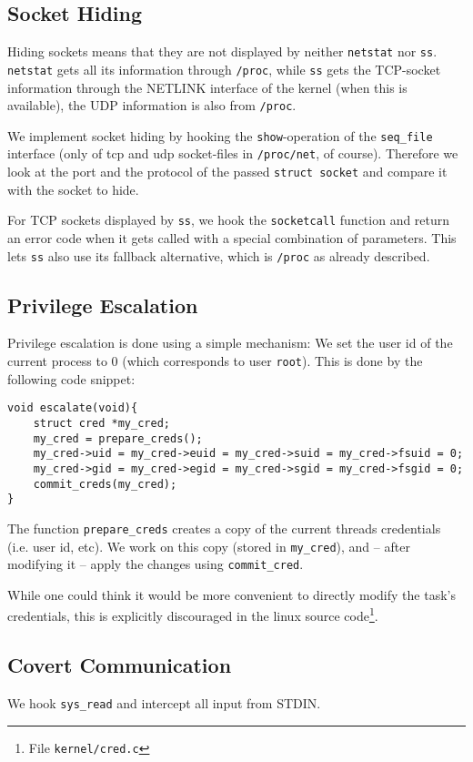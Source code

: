 \documentclass[10pt, letterpaper]{scrartcl}
\begin{document}
\subsection{Socket Hiding}
\label{sec:sockethiding}
Hiding sockets means that they are not displayed by neither \texttt{netstat} nor \texttt{ss}. \texttt{netstat} gets all its information through \texttt{/proc}, while \texttt{ss} gets the TCP-socket information through the NETLINK interface of the kernel (when this is available), the UDP information is also from \texttt{/proc}.

We implement socket hiding by hooking the \texttt{show}-operation of the \texttt{seq\_file} interface (only of tcp and udp socket-files in \texttt{/proc/net}, of course). Therefore we look at the port and the protocol of the passed \texttt{struct socket} and compare it with the socket to hide.

For TCP sockets displayed by \texttt{ss}, we hook the \texttt{socketcall} function and return an error code when it gets called with a special combination of parameters. This lets \texttt{ss} also use its fallback alternative, which is \texttt{/proc} as already described.

\subsection{Privilege Escalation}
\label{sec:privilege_escalation}
Privilege escalation is done using a simple mechanism: We set the user id of the current process to 0 (which corresponds to user \texttt{root}). This is done by the following code snippet:

\begin{verbatim}
void escalate(void){
    struct cred *my_cred;
    my_cred = prepare_creds(); 
    my_cred->uid = my_cred->euid = my_cred->suid = my_cred->fsuid = 0;
    my_cred->gid = my_cred->egid = my_cred->sgid = my_cred->fsgid = 0;
    commit_creds(my_cred);
}
\end{verbatim}

The function \texttt{prepare\_creds} creates a copy of the current threads credentials (i.e. user id, etc). We work on this copy (stored in \texttt{my\_cred}), and -- after modifying it -- apply the changes using \texttt{commit\_cred}.

While one could think it would be more convenient to directly modify the task's credentials, this is explicitly discouraged in the linux source code\footnote{File \texttt{kernel/cred.c}}.

\subsection{Covert Communication}
\label{sec:covert_communication}
We hook \texttt{sys\_read} and intercept all input from STDIN. 
\end{document}
